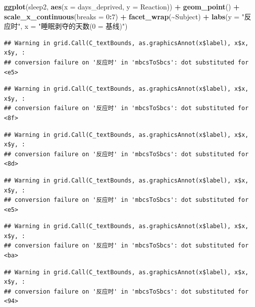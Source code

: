 \documentclass[
]{book}
\newenvironment{Shaded}{\begin{snugshade}}{\end{snugshade}}
\newcommand{\AttributeTok}[1]{\textcolor[rgb]{0.13,0.29,0.53}{#1}}
\newcommand{\DecValTok}[1]{\textcolor[rgb]{0.00,0.00,0.81}{#1}}
\newcommand{\FunctionTok}[1]{\textcolor[rgb]{0.13,0.29,0.53}{\textbf{#1}}}
\newcommand{\NormalTok}[1]{#1}
\newcommand{\SpecialCharTok}[1]{\textcolor[rgb]{0.81,0.36,0.00}{\textbf{#1}}}
\newcommand{\StringTok}[1]{\textcolor[rgb]{0.31,0.60,0.02}{#1}}
\begin{document}
\begin{Shaded}
\begin{Highlighting}[]
\FunctionTok{ggplot}\NormalTok{(sleep2, }\FunctionTok{aes}\NormalTok{(}\AttributeTok{x =}\NormalTok{ days\_deprived, }\AttributeTok{y =}\NormalTok{ Reaction)) }\SpecialCharTok{+}
  \FunctionTok{geom\_point}\NormalTok{() }\SpecialCharTok{+}
  \FunctionTok{scale\_x\_continuous}\NormalTok{(}\AttributeTok{breaks =} \DecValTok{0}\SpecialCharTok{:}\DecValTok{7}\NormalTok{) }\SpecialCharTok{+}
  \FunctionTok{facet\_wrap}\NormalTok{(}\SpecialCharTok{\textasciitilde{}}\NormalTok{Subject) }\SpecialCharTok{+}
  \FunctionTok{labs}\NormalTok{(}\AttributeTok{y =} \StringTok{"反应时"}\NormalTok{, }\AttributeTok{x =} \StringTok{"睡眠剥夺的天数(0 = 基线)"}\NormalTok{)}
\end{Highlighting}
\end{Shaded}

\begin{verbatim}
## Warning in grid.Call(C_textBounds, as.graphicsAnnot(x$label), x$x, x$y, :
## conversion failure on '反应时' in 'mbcsToSbcs': dot substituted for <e5>
\end{verbatim}

\begin{verbatim}
## Warning in grid.Call(C_textBounds, as.graphicsAnnot(x$label), x$x, x$y, :
## conversion failure on '反应时' in 'mbcsToSbcs': dot substituted for <8f>
\end{verbatim}

\begin{verbatim}
## Warning in grid.Call(C_textBounds, as.graphicsAnnot(x$label), x$x, x$y, :
## conversion failure on '反应时' in 'mbcsToSbcs': dot substituted for <8d>
\end{verbatim}

\begin{verbatim}
## Warning in grid.Call(C_textBounds, as.graphicsAnnot(x$label), x$x, x$y, :
## conversion failure on '反应时' in 'mbcsToSbcs': dot substituted for <e5>
\end{verbatim}

\begin{verbatim}
## Warning in grid.Call(C_textBounds, as.graphicsAnnot(x$label), x$x, x$y, :
## conversion failure on '反应时' in 'mbcsToSbcs': dot substituted for <ba>
\end{verbatim}

\begin{verbatim}
## Warning in grid.Call(C_textBounds, as.graphicsAnnot(x$label), x$x, x$y, :
## conversion failure on '反应时' in 'mbcsToSbcs': dot substituted for <94>
\end{verbatim}
\end{document}
